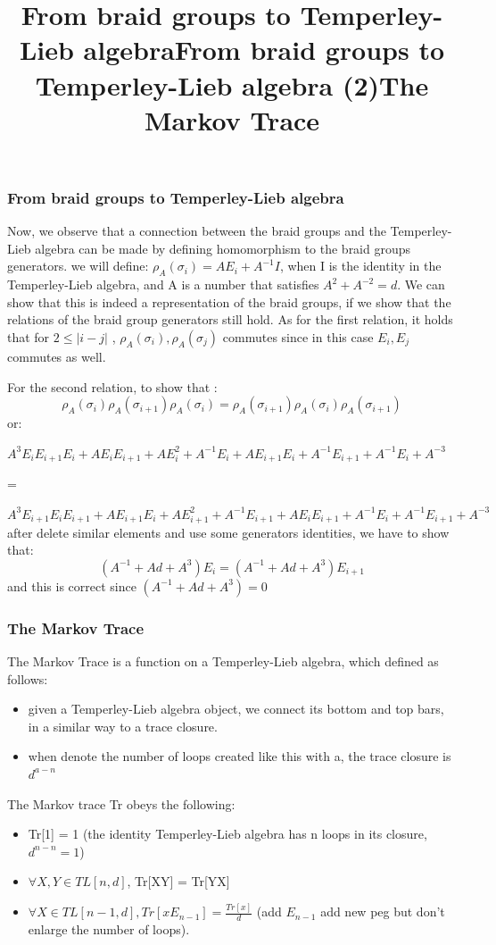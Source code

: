 \documentclass{article}
\begin{document}
\subsubsection{From braid groups to Temperley-Lieb algebra }
\title{From braid groups to Temperley-Lieb algebra}
Now, we observe that a connection between the braid groups and the Temperley-Lieb algebra can
be made by defining homomorphism to the braid groups generators. we will define:
$\rho_{A}(\sigma_{i}) = AE_{i} +A^{-1}I$, when I is the identity in the Temperley-Lieb algebra,
and A is a number that satisfies $A^{2}+A^{-2}=d$.
We can show that this is indeed a representation of the braid groups, if we show that the relations
of the braid group generators still hold.
As for the first relation, it holds that for $2 \leq |i-j|$ , $\rho_{A}(\sigma_{i}),\rho_{A}(\sigma_{j})$ commutes since in this case $E_{i},E_{j}$ commutes as well.

\title{From braid groups to Temperley-Lieb algebra (2)}
For the second relation, to show that :
\begin{displaymath}
\rho_{A}(\sigma_{i})\rho_{A}(\sigma_{i+1})\rho_{A}(\sigma_{i})= \rho_{A}(\sigma_{i+1})\rho_{A}(\sigma_{i})\rho_{A}(\sigma_{i+1})
\end{displaymath}
or:

$
A^{3}E_{i}E_{i+1}E_{i} +AE_{i}E_{i+1} + AE_{i}^{2} + A^{-1}E_{i} +AE_{i+1}E_{i}+A^{-1}E_{i+1} + A^{-1}E_{i} + A^{-3}$

=

$
A^{3}E_{i+1}E_{i}E_{i+1} +AE_{i+1}E_{i} + AE_{i+1}^{2} + A^{-1}E_{i+1} +AE_{i}E_{i+1}+A^{-1}E_{i} + A^{-1}E_{i+1} + A^{-3}
$
after delete similar elements and use some generators identities, we have to show that:
\begin{displaymath}
(A^{-1}+Ad+A^{3})E_{i}= (A^{-1}+Ad+A^{3})E_{i+1}
\end{displaymath}
and this is correct since $(A^{-1}+Ad+A^{3}) = 0$



\subsubsection{The Markov Trace}
\title{The Markov Trace}
The Markov Trace is a function on a Temperley-Lieb algebra, which defined as follows:
\begin{itemize}
\item given a Temperley-Lieb algebra object, we connect its bottom and top bars, in a similar way to
a trace closure.
\item when denote the number of loops created like this with a, the trace closure is $d^{a-n}$
\end{itemize}
The Markov trace Tr obeys the following:
\begin{itemize}
\item Tr[1] = 1 (the identity Temperley-Lieb algebra has n loops in its closure, $d^{n-n} = 1$)
\item $\forall X,Y \in TL[n,d]$, Tr[XY] = Tr[YX] 
\item $\forall X \in TL[n-1, d], Tr[xE_{n-1}]=\frac{Tr[x]}{d}$ (add $E_{n-1}$ add new peg but don't enlarge the number of loops).
\end{itemize}
\end{document}
